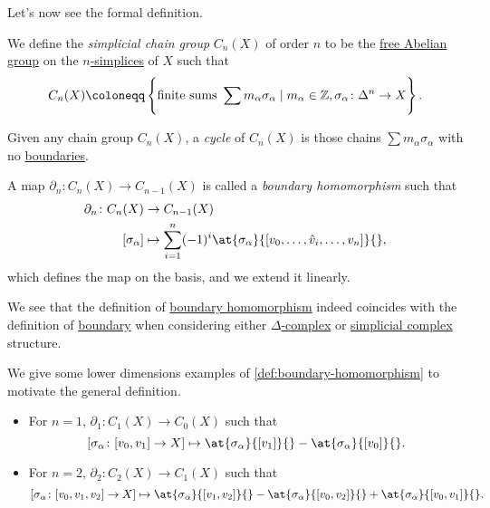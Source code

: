 Let's now see the formal definition.
\begin{definition}\label{def:simplicial-chain-group}
	We define the \emph{simplicial chain group} \(C_{n} (X)\) of order \(n\) to be the \hyperref[def:free-Abelian-group]{free Abelian group} on the \hyperref[def:standard-simplex]{\(n\)-simplices} of \(X\) such
	that
	\[
		C_{n} (X) \coloneqq \left\{\text{finite sums } \sum\limits_{}^{} m_\alpha \sigma _\alpha \mid m_\alpha \in \mathbb{\MakeUppercase{z}} , \sigma _\alpha \colon \Delta ^n \to X\right\}.
	\]
\end{definition}

\begin{definition}[Cycles]\label{def:cycle}
	Given any chain group \(C_{n} (X)\), a \emph{cycle} of \(C_{n} (X)\) is those chains \(\sum m_\alpha \sigma _\alpha\)
	with no \hyperref[def:boundary]{boundaries}.
\end{definition}

\begin{definition}\label{def:boundary-homomorphism}
	A map \(\partial_{n} \colon C_{n} (X)\to C_{n-1}(X) \) is called a \emph{boundary homomorphism} such that
	\[
		\begin{split}
			\partial_{n} \colon C_{n} (X)&\to C_{n-1}(X)\\
			[\sigma _\alpha ]&\mapsto \sum\limits_{i=1}^{n} (-1)^i \at{\sigma _\alpha}{[v_0, \ldots , \hat{v}_{i}, \ldots , v_{n}]}{},
		\end{split}
	\]
	which defines the map on the basis, and we extend it linearly.
\end{definition}
\begin{remark}
	We see that the definition of \hyperref[def:boundary-homomorphism]{boundary homomorphism} indeed coincides with the definition of
	\hyperref[def:boundary]{boundary} when considering either \hyperref[def:delta-complex]{\(\Delta\)-complex} or
	\hyperref[def:simplicial-complex]{simplicial complex} structure.
\end{remark}

\begin{eg}
	We give some lower dimensions examples of \autoref{def:boundary-homomorphism} to motivate the general definition.
	\begin{itemize}
		\item For \(n=1\), \(\partial_1\colon C_1(X)\to C_0(X)\) such that
		      \[
			      [\sigma _\alpha \colon [v_0, v_1]\to X]\mapsto \at{\sigma _\alpha }{[v_1]}{} - \at{\sigma _\alpha }{[v_0]}{}.
		      \]
		\item For \(n=2\), \(\partial_2\colon C_2(X)\to C_1(X)\) such that
		      \[
			      [\sigma _\alpha \colon [v_0, v_1, v_2]\to X]\mapsto \at{\sigma _\alpha }{[v_1,v_2]}{} - \at{\sigma _\alpha }{[v_0, v_2]}{} + \at{\sigma _\alpha }{[v_0, v_1]}{}.
		      \]
	\end{itemize}
\end{eg}


